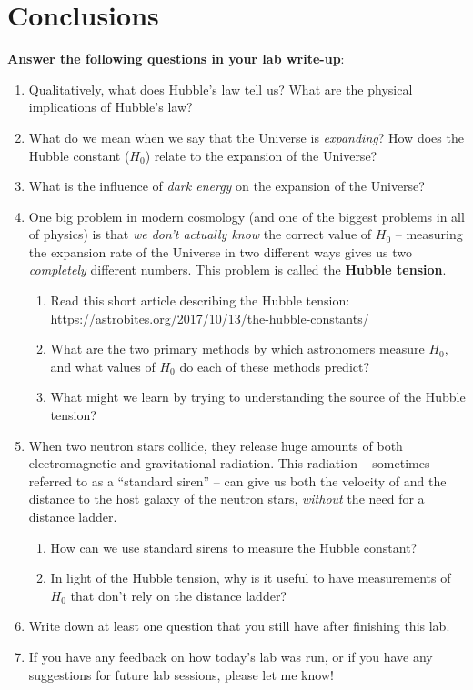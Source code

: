 \documentclass[11pt]{article}
\begin{document}
\section{Conclusions}
\textbf{Answer the following questions in your lab write-up}:
\begin{enumerate}

    \item Qualitatively, what does Hubble's law tell us? What are the physical implications of Hubble's law?
    
    \item What do we mean when we say that the Universe is \emph{expanding}? How does the Hubble constant ($H_0$) relate to the expansion of the Universe?
    
    \item What is the influence of \emph{dark energy} on the expansion of the Universe?

    \item One big problem in modern cosmology (and one of the biggest problems in all of physics) is that \emph{we don't actually know} the correct value of $H_0$ -- measuring the expansion rate of the Universe in two different ways gives us two \emph{completely} different numbers. This problem is called the \textbf{Hubble tension}.
    \begin{enumerate}
        \item Read this short article describing the Hubble tension: \url{https://astrobites.org/2017/10/13/the-hubble-constants/}
        
        \item What are the two primary methods by which astronomers measure $H_0$, and what values of $H_0$ do each of these methods predict?
        
        \item What might we learn by trying to understanding the source of the Hubble tension?
    \end{enumerate}
    
    \item When two neutron stars collide, they release huge amounts of both electromagnetic and gravitational radiation. This radiation -- sometimes referred to as a ``standard siren'' -- can give us both the velocity of and the distance to the host galaxy of the neutron stars, \emph{without} the need for a distance ladder.
    \begin{enumerate}
        \item How can we use standard sirens to measure the Hubble constant?
        
        \item In light of the Hubble tension, why is it useful to have measurements of $H_0$ that don't rely on the distance ladder?
    \end{enumerate}

    \item Write down at least one question that you still have after finishing this lab.
    
    \item If you have any feedback on how today's lab was run, or if you have any suggestions for future lab sessions, please let me know!
    
    
\end{enumerate}
\end{document}
